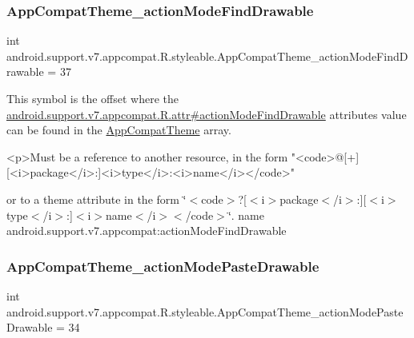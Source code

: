 \subsubsection{\texorpdfstring{App\+Compat\+Theme\+\_\+action\+Mode\+Find\+Drawable}{AppCompatTheme\_actionModeFindDrawable}}
{\footnotesize\ttfamily int android.\+support.\+v7.\+appcompat.\+R.\+styleable.\+App\+Compat\+Theme\+\_\+action\+Mode\+Find\+Drawable = 37\hspace{0.3cm}{\ttfamily [static]}}

This symbol is the offset where the \hyperlink{classandroid_1_1support_1_1v7_1_1appcompat_1_1R_1_1attr_a7328edaaa32233c007eaf09fb8ae5524}{android.\+support.\+v7.\+appcompat.\+R.\+attr\#action\+Mode\+Find\+Drawable} attribute\textquotesingle{}s value can be found in the \hyperlink{classandroid_1_1support_1_1v7_1_1appcompat_1_1R_1_1styleable_a5c42f89e8a410c323be34208d75c430b}{App\+Compat\+Theme} array.

\begin{DoxyVerb}      <p>Must be a reference to another resource, in the form "<code>@[+][<i>package</i>:]<i>type</i>:<i>name</i></code>"
\end{DoxyVerb}
 or to a theme attribute in the form \char`\"{}$<$code$>$?\mbox{[}$<$i$>$package$<$/i$>$\+:\mbox{]}\mbox{[}$<$i$>$type$<$/i$>$\+:\mbox{]}$<$i$>$name$<$/i$>$$<$/code$>$\char`\"{}.  name android.\+support.\+v7.\+appcompat\+:action\+Mode\+Find\+Drawable \mbox{\label{classandroid_1_1support_1_1v7_1_1appcompat_1_1R_1_1styleable_a5db0af8493a36e6db8e132914416ea82}} 
\subsubsection{\texorpdfstring{App\+Compat\+Theme\+\_\+action\+Mode\+Paste\+Drawable}{AppCompatTheme\_actionModePasteDrawable}}
{\footnotesize\ttfamily int android.\+support.\+v7.\+appcompat.\+R.\+styleable.\+App\+Compat\+Theme\+\_\+action\+Mode\+Paste\+Drawable = 34\hspace{0.3cm}{\ttfamily [static]}}

